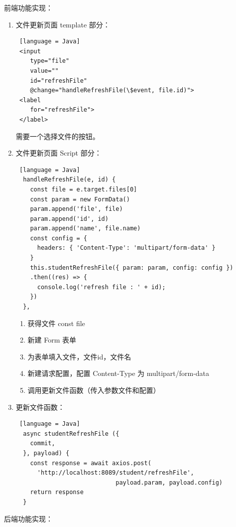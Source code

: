前端功能实现：
\begin{enumerate}
  \item 文件更新页面 template 部分：
        \begin{lstlisting} [language = Java]
 <input 
    type="file" 
    value="" 
    id="refreshFile" 
    @change="handleRefreshFile(\$event, file.id)">
 <label 
    for="refreshFile">
 </label>
    \end{lstlisting}
        需要一个选择文件的按钮。
  \item 文件更新页面 Script 部分：
        \begin{lstlisting} [language = Java]
  handleRefreshFile(e, id) {
    const file = e.target.files[0]
    const param = new FormData()
    param.append('file', file)
    param.append('id', id)
    param.append('name', file.name)
    const config = {
      headers: { 'Content-Type': 'multipart/form-data' }
    }
    this.studentRefreshFile({ param: param, config: config })
    .then((res) => {
      console.log('refresh file : ' + id);
    })
  },
    \end{lstlisting}
        \begin{enumerate}
          \item 获得文件 const file
          \item 新建 Form 表单
          \item 为表单填入文件，文件id，文件名
          \item 新建请求配置，配置 Content-Type 为 multipart/form-data
          \item 调用更新文件函数（传入参数文件和配置）
        \end{enumerate}
  \item 更新文件函数：
        \begin{lstlisting} [language = Java]
  async studentRefreshFile ({
    commit,
  }, payload) {
    const response = await axios.post(
      'http://localhost:8089/student/refreshFile', 
                            payload.param, payload.config)
    return response
  }
    \end{lstlisting}
\end{enumerate}
后端功能实现：
